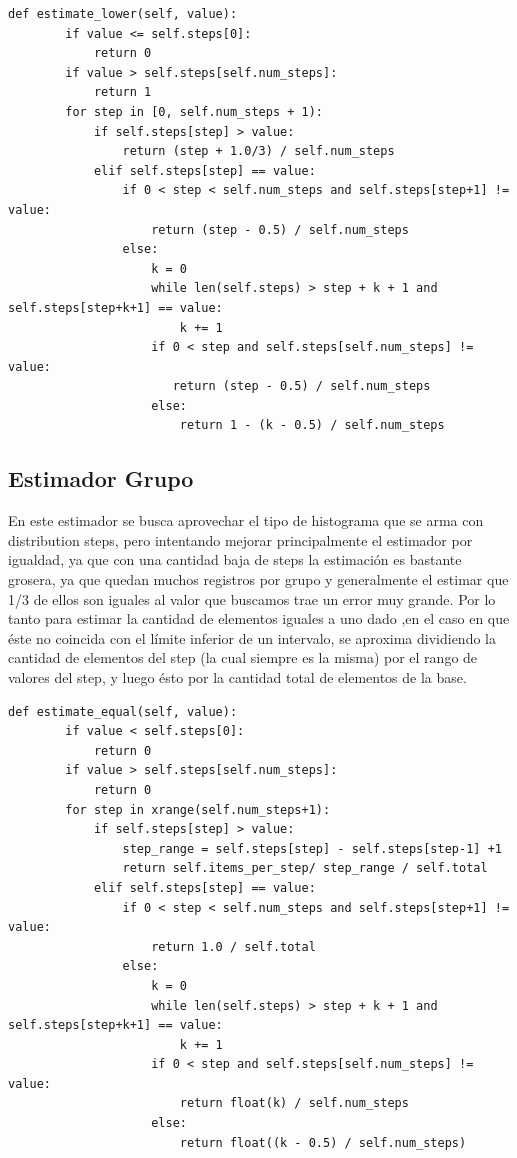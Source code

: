 \documentclass[a4paper, 10pt, twoside]{article}
\begin{document}
\begin{verbatim}
def estimate_lower(self, value):
        if value <= self.steps[0]:
            return 0
        if value > self.steps[self.num_steps]:
            return 1
        for step in [0, self.num_steps + 1):
            if self.steps[step] > value:
                return (step + 1.0/3) / self.num_steps
            elif self.steps[step] == value:
                if 0 < step < self.num_steps and self.steps[step+1] != value:
                    return (step - 0.5) / self.num_steps
                else:
                    k = 0
                    while len(self.steps) > step + k + 1 and self.steps[step+k+1] == value:
                        k += 1
                    if 0 < step and self.steps[self.num_steps] != value:
                       return (step - 0.5) / self.num_steps
                    else:
                        return 1 - (k - 0.5) / self.num_steps
\end{verbatim}

\subsection{Estimador Grupo}

En este estimador se busca aprovechar el tipo de histograma que se arma con distribution steps,
pero intentando mejorar principalmente el estimador por igualdad, ya que con una cantidad baja de steps la estimación es bastante grosera, ya que quedan muchos registros por
grupo y generalmente el estimar que 1/3 de ellos son iguales al valor que buscamos trae un error muy grande.
Por lo tanto para estimar la cantidad de elementos iguales a uno dado ,en el caso en que éste no coincida con el límite inferior de un intervalo, se aproxima dividiendo la cantidad de elementos del step
(la cual siempre es la misma) por el rango de valores del step, y luego ésto por la cantidad total de elementos de la base.

\begin{verbatim}
def estimate_equal(self, value):
        if value < self.steps[0]:
            return 0
        if value > self.steps[self.num_steps]:
            return 0
        for step in xrange(self.num_steps+1):
            if self.steps[step] > value:
                step_range = self.steps[step] - self.steps[step-1] +1
                return self.items_per_step/ step_range / self.total
            elif self.steps[step] == value:
                if 0 < step < self.num_steps and self.steps[step+1] != value:
                    return 1.0 / self.total
                else:
                    k = 0
                    while len(self.steps) > step + k + 1 and self.steps[step+k+1] == value:
                        k += 1
                    if 0 < step and self.steps[self.num_steps] != value:
                        return float(k) / self.num_steps
                    else:
                        return float((k - 0.5) / self.num_steps)

\end{verbatim}
\end{document}
